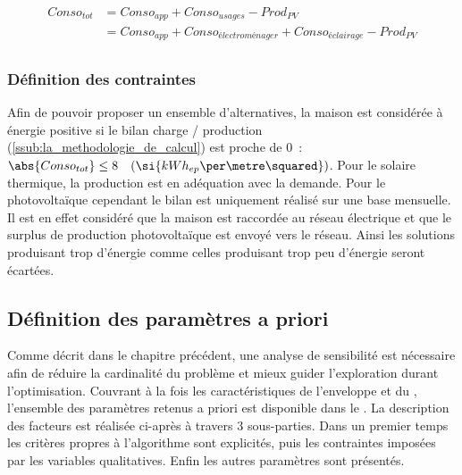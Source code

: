 \begin{align} \label{eq:conso_totale}
  Conso_{tot} &= Conso_{app} + Conso_{usages} - Prod_{PV}  \\
              &= Conso_{app} + Conso_{électroménager} + Conso_{éclairage} - Prod_{PV} \\
\end{align}


\subsubsection{Définition des contraintes} %
\label{ssub:definition_des_contraintes}
Afin de pouvoir proposer un ensemble d’alternatives, la maison est considérée
à énergie positive si le bilan charge / production (\ref{ssub:la_methodologie_de_calcul})
est proche de $0$~: $\abs{Conso_{tot}}   \leq  8 \quad (\si{kWh_{ep}\per\metre\squared})$.
Pour le solaire thermique, la production est en adéquation avec la demande. Pour le
photovoltaïque cependant le bilan est uniquement réalisé sur une base mensuelle. Il
est en effet considéré que la maison est raccordée au réseau électrique et que le surplus
de production photovoltaïque est envoyé vers le réseau.
Ainsi les solutions produisant trop d’énergie comme celles produisant trop peu d’énergie
seront écartées.



\subsection{Définition des paramètres a priori} %
\label{sub:definition_des_parametres_a_priori}
Comme décrit dans le chapitre précédent, une analyse de sensibilité est nécessaire
afin de réduire la cardinalité du problème et mieux guider l’exploration durant l’optimisation.
Couvrant à la fois les caractéristiques de l’enveloppe et du , l’ensemble des
paramètres retenus a priori est disponible dans le .
La description des facteurs est réalisée ci-après à travers $3$ sous-parties. Dans un premier
temps les critères propres à l’algorithme sont explicités, puis les contraintes imposées
par les variables qualitatives. Enfin les autres paramètres sont présentés.

